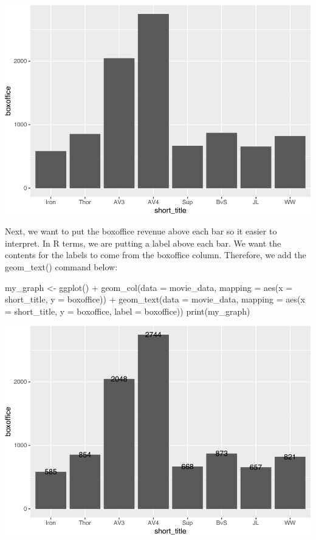 \documentclass[
]{krantz}
\makeatletter
\newenvironment{Shaded}{\begin{snugshade}}{\end{snugshade}}
\newcommand{\AttributeTok}[1]{\textcolor[rgb]{0.61,0.61,0.61}{#1}}
\newcommand{\FunctionTok}[1]{\textcolor[rgb]{0,0,0}{#1}}
\newcommand{\NormalTok}[1]{#1}
\newcommand{\OtherTok}[1]{\textcolor[rgb]{0.37,0.37,0.37}{#1}}
\newcommand{\SpecialCharTok}[1]{\textcolor[rgb]{0,0,0}{#1}}
\newenvironment{kframe}{%
\medskip{}
\setlength{\fboxsep}{.8em}
 \def\at@end@of@kframe{}%
 \ifinner\ifhmode%
  \def\at@end@of@kframe{\end{minipage}}%
  \begin{minipage}{\columnwidth}%
 \fi\fi%
 \def\FrameCommand##1{\hskip\@totalleftmargin \hskip-\fboxsep
 \colorbox{shadecolor}{##1}\hskip-\fboxsep
     \hskip-\linewidth \hskip-\@totalleftmargin \hskip\columnwidth}%
 \MakeFramed {\advance\hsize-\width
   \@totalleftmargin\z@ \linewidth\hsize
   \@setminipage}}%
 {\par\unskip\endMakeFramed%
 \at@end@of@kframe}
\renewenvironment{Shaded}{\begin{kframe}}{\end{kframe}}
\makeatother
\begin{document}
\includegraphics[width=0.65\linewidth]{bookdown_files/figure-latex/unnamed-chunk-198-1}

Next, we want to put the boxoffice revenue above each bar so it easier to interpret. In R terms, we are putting a label above each bar. We want the contents for the labels to come from the boxoffice column. Therefore, we add the geom\_text() command below:

\begin{Shaded}
\begin{Highlighting}[]
\NormalTok{my\_graph }\OtherTok{\textless{}{-}} \FunctionTok{ggplot}\NormalTok{() }\SpecialCharTok{+}
  \FunctionTok{geom\_col}\NormalTok{(}\AttributeTok{data =}\NormalTok{ movie\_data,}
           \AttributeTok{mapping =} \FunctionTok{aes}\NormalTok{(}\AttributeTok{x =}\NormalTok{ short\_title, }
                         \AttributeTok{y =}\NormalTok{ boxoffice)) }\SpecialCharTok{+}
  \FunctionTok{geom\_text}\NormalTok{(}\AttributeTok{data =}\NormalTok{ movie\_data, }
           \AttributeTok{mapping =} \FunctionTok{aes}\NormalTok{(}\AttributeTok{x =}\NormalTok{ short\_title, }
                         \AttributeTok{y =}\NormalTok{ boxoffice, }
                         \AttributeTok{label =}\NormalTok{ boxoffice))}
\FunctionTok{print}\NormalTok{(my\_graph)}
\end{Highlighting}
\end{Shaded}

\includegraphics[width=0.65\linewidth]{bookdown_files/figure-latex/unnamed-chunk-199-1}
\end{document}
